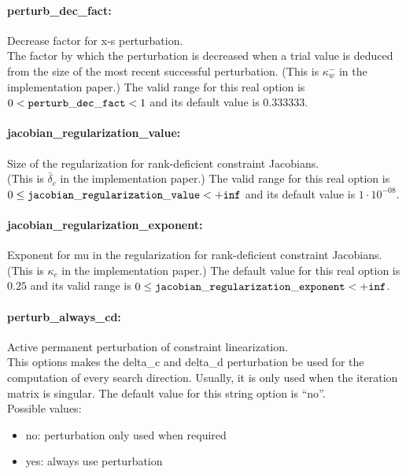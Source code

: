 \paragraph{perturb\_dec\_fact:} Decrease factor for x-s perturbation. $\;$ \\
 The factor by which the perturbation is decreased
when a trial value is deduced from the size of
the most recent successful perturbation. (This is
$\kappa_w^-$ in the implementation paper.) The valid range for this real option is 
$0 <  {\tt perturb\_dec\_fact } <  1$
and its default value is $0.333333$.


\paragraph{jacobian\_regularization\_value:} Size of the regularization for rank-deficient constraint Jacobians. $\;$ \\
 (This is $\bar\delta_c$ in the implementation
paper.) The valid range for this real option is\\ 
$0 \le {\tt jacobian\_regularization\_value } <  {\tt +inf}$
and its default value is $1 \cdot 10^{-08}$.


\paragraph{jacobian\_regularization\_exponent:} Exponent for mu in the regularization for rank-deficient constraint Jacobians. $\;$ \\
 (This is $\kappa_c$ in the implementation paper.) The default value for this real option is $0.25$
and its valid range is $0 \le {\tt jacobian\_regularization\_exponent } <  {\tt +inf}$.


\paragraph{perturb\_always\_cd:} Active permanent perturbation of constraint linearization. $\;$ \\
 This options makes the delta\_c and delta\_d
perturbation be used for the computation of every
search direction.  Usually, it is only used when
the iteration matrix is singular.
The default value for this string option is ``no''.
\\ 
Possible values:
\begin{itemize}
   \item no: perturbation only used when required
   \item yes: always use perturbation
\end{itemize}

